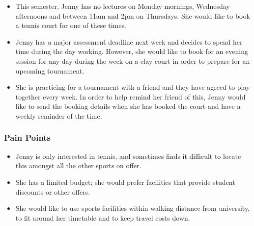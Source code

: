 \begin{itemize}
	\item This semester, Jenny has no lectures on Monday mornings,
		Wednesday afternoons and between 11am and 2pm on Thursdays.
		She would like to book a tennis court for one of these times.

	\item Jenny has a major assessment deadline next week and decides
		to spend her time during the day working. However, she would
		like to book for an evening session for any day during the
		week on a clay court in order to prepare for an upcoming
		tournament.

	\item She is practicing for a tournament with a friend and they have
		agreed to play together every week. In order to help remind her
		friend of this, Jenny would like to send the booking details when she
		has booked the court and have a weekly reminder of the time.
\end{itemize}


\subsubsection*{Pain Points}
\label{ssub:student_pain_points}

\begin{itemize}
	\item Jenny is only interested in tennis, and sometimes finds it difficult
		to locate this amongst all the other sports on offer.

	\item She has a limited budget; she would prefer facilities that provide
		student discounts or other offers.

	\item She would like to use sports facilities within walking distance from
		university, to fit around her timetable and to keep travel costs down.
\end{itemize}

